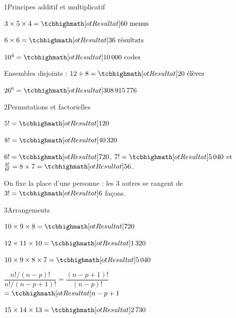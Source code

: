 

\begin{deuxcolonnes}

\begin{corrige}{1}{Principes additif et multiplicatif}
\begin{questions}
  \item $3\times5\times4=\res{60\text{ menus}}$
  \item $6\times6=\res{36\text{ résultats}}$
  \item $10^{4}=\res{10\,000\text{ codes}}$
  \item Ensembles disjoints : $12+8=\res{20\text{ élèves}}$
  \item $26^{6}=\res{308\,915\,776}$
\end{questions}
\end{corrige}

\begin{corrige}{2}{Permutations et factorielles}
\begin{questions}
  \item $5!=\res{120}$
  \item $8!=\res{40\,320}$
  \item $6!=\res{720}$, $7!=\res{5\,040}$ et $\frac{8!}{6!}=8\times7=\res{56}$.
  \item On fixe la place d'une personne : les $3$ autres se rangent de $3!=\res{6}$ façons.
\end{questions}
\end{corrige}

\begin{corrige}{3}{Arrangements}
\begin{questions}
  \item $10\times9\times8=\res{720}$
  \item $12\times11\times10=\res{1\,320}$
  \item $10\times9\times8\times7=\res{5\,040}$
  \item $\dfrac{n!/(n-p)!}{n!/(n-p+1)!}=\dfrac{(n-p+1)!}{(n-p)!}$\\ $=\res{n-p+1}$
  \item $15\times14\times13=\res{2\,730}$
\end{questions}
\end{corrige}


\end{deuxcolonnes}
